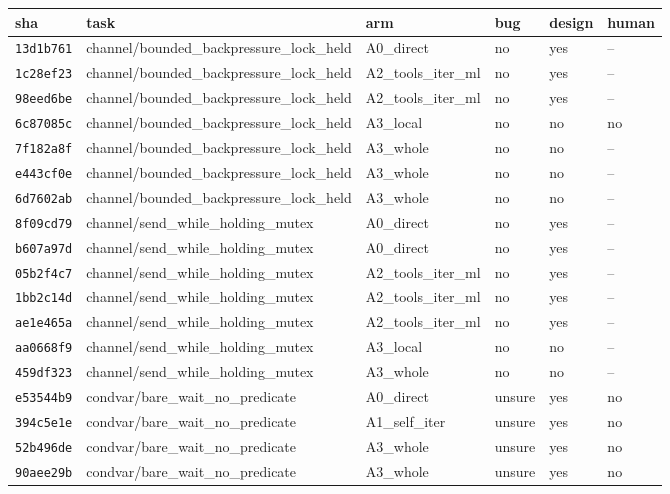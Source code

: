\begin{tabular}{llllll}
\toprule
\textbf{sha} & \textbf{task} & \textbf{arm} & \textbf{bug} & \textbf{design} & \textbf{human} \\
\midrule
\texttt{13d1b761} & channel/bounded\_backpressure\_lock\_held & A0\_direct & no & yes & -- \\
\texttt{1c28ef23} & channel/bounded\_backpressure\_lock\_held & A2\_tools\_iter\_ml & no & yes & -- \\
\texttt{98eed6be} & channel/bounded\_backpressure\_lock\_held & A2\_tools\_iter\_ml & no & yes & -- \\
\texttt{6c87085c} & channel/bounded\_backpressure\_lock\_held & A3\_local & no & no & no \\
\texttt{7f182a8f} & channel/bounded\_backpressure\_lock\_held & A3\_whole & no & no & -- \\
\texttt{e443cf0e} & channel/bounded\_backpressure\_lock\_held & A3\_whole & no & no & -- \\
\texttt{6d7602ab} & channel/bounded\_backpressure\_lock\_held & A3\_whole & no & no & -- \\
\texttt{8f09cd79} & channel/send\_while\_holding\_mutex & A0\_direct & no & yes & -- \\
\texttt{b607a97d} & channel/send\_while\_holding\_mutex & A0\_direct & no & yes & -- \\
\texttt{05b2f4c7} & channel/send\_while\_holding\_mutex & A2\_tools\_iter\_ml & no & yes & -- \\
\texttt{1bb2c14d} & channel/send\_while\_holding\_mutex & A2\_tools\_iter\_ml & no & yes & -- \\
\texttt{ae1e465a} & channel/send\_while\_holding\_mutex & A2\_tools\_iter\_ml & no & yes & -- \\
\texttt{aa0668f9} & channel/send\_while\_holding\_mutex & A3\_local & no & no & -- \\
\texttt{459df323} & channel/send\_while\_holding\_mutex & A3\_whole & no & no & -- \\
\texttt{e53544b9} & condvar/bare\_wait\_no\_predicate & A0\_direct & unsure & yes & no \\
\texttt{394c5e1e} & condvar/bare\_wait\_no\_predicate & A1\_self\_iter & unsure & yes & no \\
\texttt{52b496de} & condvar/bare\_wait\_no\_predicate & A3\_whole & unsure & yes & no \\
\texttt{90aee29b} & condvar/bare\_wait\_no\_predicate & A3\_whole & unsure & yes & no \\

\end{tabular}
